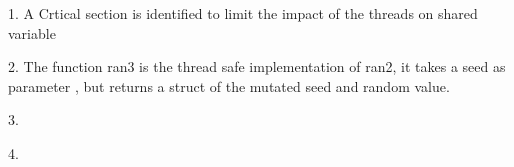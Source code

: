 \documentclass[a4paper]{article}
\begin{document}
1. A Crtical section is identified to limit the impact of the threads on shared variable
 


2. The function ran3 is the thread safe implementation of ran2, it takes a seed as parameter , but returns a struct of the mutated seed and random value.

 

3. 

4.
\end{document}
